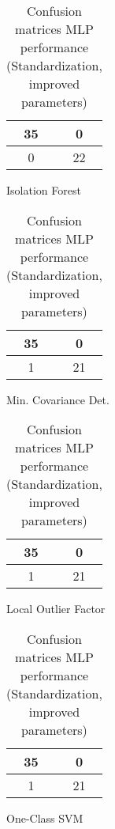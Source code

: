 \documentclass{article}
\begin{document}
\begin{table}[h]
\begin{subtable}[h]{0.2\textwidth}
\centering
\begin{tabular}{c|c}
35 & 0 \\
\hline
0 & 22 \\
\end{tabular}
\caption{Isolation Forest}
\end{subtable}
\hfill
\begin{subtable}[h]{0.2\textwidth}
\centering
\begin{tabular}{c|c}
35 & 0 \\
\hline
1 & 21 \\
\end{tabular}
\caption{Min. Covariance Det.}
\end{subtable}
\hfill
\begin{subtable}[h]{0.2\textwidth}
\centering
\begin{tabular}{c|c}
35 & 0 \\
\hline
1 & 21 \\
\end{tabular}
\caption{Local Outlier Factor}
\end{subtable}
\hfill
\begin{subtable}[h]{0.2\textwidth}
\centering
\begin{tabular}{c|c}
35 & 0 \\
\hline
1 & 21 \\
\end{tabular}
\caption{One-Class SVM}
\end{subtable}
\caption{Confusion matrices MLP performance (Standardization, improved parameters)}
\end{table}
\end{document}
